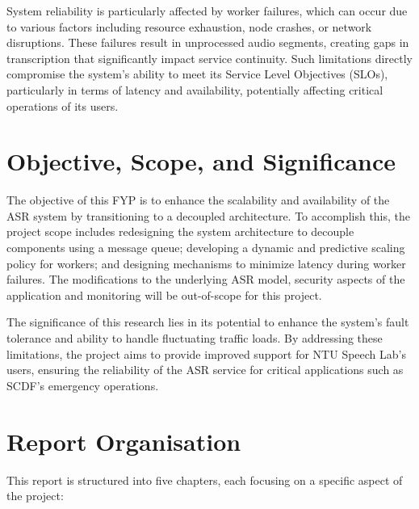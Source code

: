 System reliability is particularly affected by worker failures, which can occur due to various factors including resource exhaustion, node crashes, or network disruptions. These failures result in unprocessed audio segments, creating gaps in transcription that significantly impact service continuity. Such limitations directly compromise the system's ability to meet its Service Level Objectives (SLOs), particularly in terms of latency and availability, potentially affecting critical operations of its users.


\section{Objective, Scope, and Significance}
The objective of this FYP is to enhance the scalability and availability of the ASR system by transitioning to a decoupled architecture. To accomplish this, the project scope includes redesigning the system architecture to decouple components using a message queue; developing a dynamic and predictive scaling policy for workers; and designing mechanisms to minimize latency during worker failures. The modifications to the underlying ASR model, security aspects of the application and monitoring will be out-of-scope for this project.

The significance of this research lies in its potential to enhance the system’s fault tolerance and ability to handle fluctuating traffic loads. By addressing these limitations, the project aims to provide improved support for NTU Speech Lab’s users, ensuring the reliability of the ASR service for critical applications such as SCDF’s emergency operations.

\section{Report Organisation}
This report is structured into five chapters, each focusing on a specific aspect of the project:

